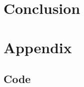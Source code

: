 \documentclass[12pt]{article}
\begin{document}
\section{Conclusion} \label{sec:4}



\newpage



 \label{sec:ref}

\newpage

\section*{Appendix} \label{sec:A}

\subsection*{Code}


\listoffigures

\listoftables
\end{document}
